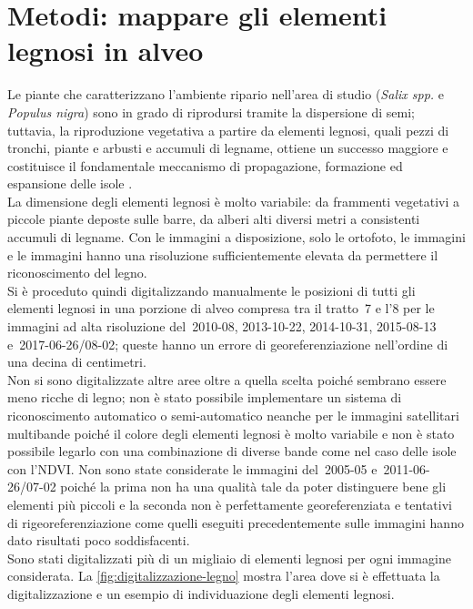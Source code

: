 \section{Metodi: mappare gli elementi legnosi in alveo}
Le piante che caratterizzano l'ambiente ripario nell'area di studio (\emph{Salix spp.} e \emph{Populus nigra}) sono in grado di riprodursi tramite la dispersione di semi;
tuttavia, la riproduzione vegetativa a partire da elementi legnosi, quali pezzi di tronchi, piante e arbusti e accumuli di legname, ottiene un successo maggiore e costituisce il fondamentale meccanismo di propagazione, formazione ed espansione delle isole .
\\
La dimensione degli elementi legnosi è molto variabile: da frammenti vegetativi a piccole piante deposte sulle barre, da alberi alti diversi metri a consistenti accumuli di legname.
Con le immagini a disposizione, solo le ortofoto, le immagini \Pl{} e le immagini \WV{} hanno una risoluzione sufficientemente elevata da permettere il riconoscimento del legno.
\\
Si è proceduto quindi digitalizzando manualmente le posizioni di tutti gli elementi legnosi in una porzione di alveo compresa tra il tratto~7 e l'8 per le immagini ad alta risoluzione del~2010-08, 2013-10-22, 2014-10-31, 2015-08-13 e~2017-06-26/08-02; queste hanno un errore di georeferenziazione nell'ordine di una decina di centimetri.
\\
Non si sono digitalizzate altre aree oltre a quella scelta poiché sembrano essere meno ricche di legno; non è stato possibile implementare un sistema di riconoscimento automatico o semi-automatico neanche per le immagini satellitari multibande poiché il colore degli elementi legnosi è molto variabile e non è stato possibile legarlo con una combinazione di diverse bande come nel caso delle isole con l'NDVI.
Non sono state considerate le immagini del~2005-05 e~2011-06-26/07-02 poiché la prima non ha una qualità tale da poter distinguere bene gli elementi più piccoli e la seconda non è perfettamente georeferenziata e tentativi di rigeoreferenziazione come quelli eseguiti precedentemente sulle immagini \AST{} hanno dato risultati poco soddisfacenti.
\\
Sono stati digitalizzati più di un migliaio di elementi legnosi per ogni immagine considerata.
La \cref{fig:digitalizzazione-legno} mostra l'area dove si è effettuata la digitalizzazione e un esempio di individuazione degli elementi legnosi.
%
